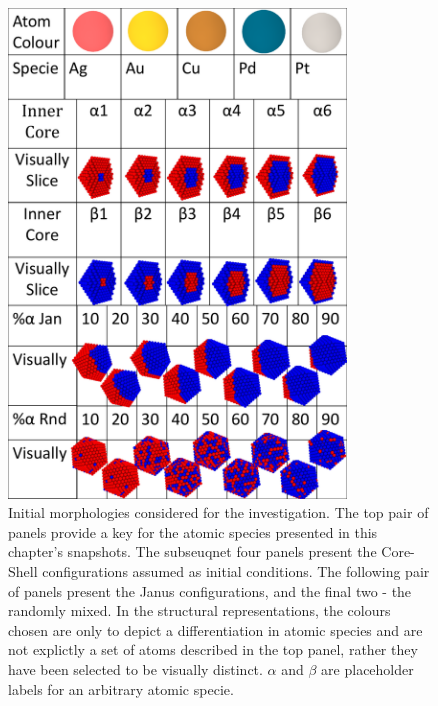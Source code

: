 \begin{figure}
    \centering
    \includegraphics[width=0.8\textwidth]{figures/MD/Alloys/Structures.pdf}
    \caption{Initial morphologies considered for the investigation. The top pair of panels provide a key for the atomic species presented in this chapter's snapshots. The subseuqnet four panels present the Core-Shell configurations assumed as initial conditions. The following pair of panels present the Janus configurations, and the final two - the randomly mixed. In the structural representations, the colours chosen are only to depict a differentiation in atomic species and are not explictly a set of atoms described in the top panel, rather they have been selected to be visually distinct. $\alpha$ and $\beta$ are placeholder labels for an arbitrary atomic specie.}
    \label{fig:Alloys_Struts}
\end{figure}

